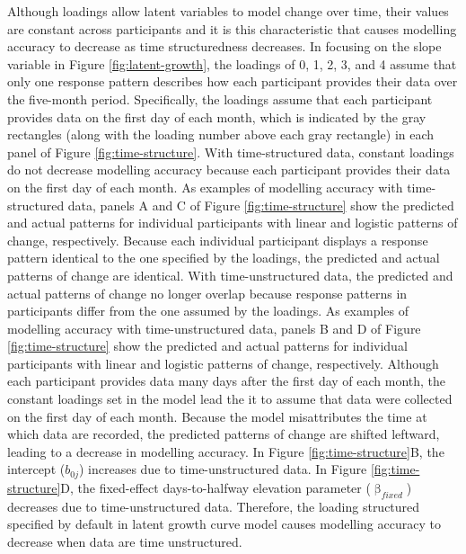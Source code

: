 \documentclass[
12pt, %
twoside,
english]{guelphthesis}
\begin{document}
Although loadings allow latent variables to model change over time, their values are constant across participants and it is this characteristic that causes modelling accuracy to decrease as time structuredness decreases. In focusing on the slope variable in Figure \ref{fig:latent-growth}, the loadings of 0, 1, 2, 3, and 4 assume that only one response pattern describes how each participant provides their data over the five-month period. Specifically, the loadings assume that each participant provides data on the first day of each month, which is indicated by the gray rectangles (along with the loading number above each gray rectangle) in each panel of Figure \ref{fig:time-structure}. With time-structured data, constant loadings do not decrease modelling accuracy because each participant provides their data on the first day of each month. As examples of modelling accuracy with time-structured data, panels A and C of Figure \ref{fig:time-structure} show the predicted and actual patterns for individual participants with linear and logistic patterns of change, respectively. Because each individual participant displays a response pattern identical to the one specified by the loadings, the predicted and actual patterns of change are identical. With time-unstructured data, the predicted and actual patterns of change no longer overlap because response patterns in participants differ from the one assumed by the loadings. As examples of modelling accuracy with time-unstructured data, panels B and D of Figure \ref{fig:time-structure} show the predicted and actual patterns for individual participants with linear and logistic patterns of change, respectively. Although each participant provides data many days after the first day of each month, the constant loadings set in the model lead the it to assume that data were collected on the first day of each month. Because the model misattributes the time at which data are recorded, the predicted patterns of change are shifted leftward, leading to a decrease in modelling accuracy. In Figure \ref{fig:time-structure}B, the intercept (\(b_{0j}\)) increases due to time-unstructured data. In Figure \ref{fig:time-structure}D, the fixed-effect days-to-halfway elevation parameter (\(\upbeta_{fixed}\)) decreases due to time-unstructured data. Therefore, the loading structured specified by default in latent growth curve model causes modelling accuracy to decrease when data are time unstructured.
\end{document}
